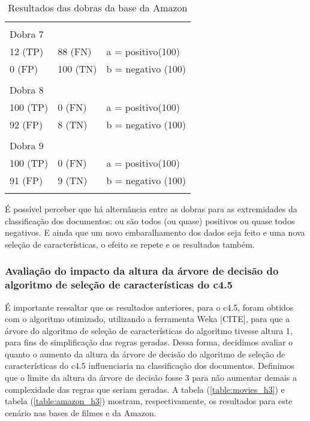 \documentclass[template.tex]{subfiles}
\begin{document}
\begin{table}[!h]
\begin{tabular}{lll}
    &&\\
    Dobra 7    \\
    12 (TP)                 &88 (FN)                    & a = positivo(100) \\ 
    0 (FP)                  &100 (TN)                   & b = negativo (100) \\
    &&\\
    Dobra 8    \\
    100 (TP)                    &0 (FN)                     & a = positivo(100) \\ 
    92 (FP)                 &8 (TN)                     & b = negativo (100) \\
    &&\\
    Dobra 9    \\
    100 (TP)                    &0 (FN)                     & a = positivo(100) \\ 
    91 (FP)                 &9 (TN)                     & b = negativo (100) \\
    &&\\
    \end{tabular}
    \caption{Resultados das dobras da base da Amazon}
    \label{table:amazon_folds}
\end{table}

É possível perceber que há alternância entre as dobras para as extremidades da classificação dos documentos: ou são todos (ou quase) positivos ou quase todos negativos. E ainda que um novo embaralhamento dos dados seja feito e uma nova seleção de características, o efeito se repete e os resultados também. 


\subsubsection{Avaliação do impacto da altura da árvore de decisão do algoritmo de seleção de características do c4.5}

É importante ressaltar que os resultados anteriores, para o c4.5, foram obtidos com o algoritmo otimizado, utilizando a ferramenta Weka [CITE], para que a árvore do algoritmo de seleção de características do algoritmo tivesse altura 1, para fins de simplificação das regras geradas. Dessa forma, decidimos avaliar o quanto o aumento da altura da árvore de decisão do algoritmo de seleção de características do c4.5 influenciaria na classificação dos documentos. Definimos que o limite da altura da árvore de decisão fosse 3 para não aumentar demais a complexidade das regras que seriam geradas. A tabela (\ref{table:movies_h3}) e tabela (\ref{table:amazon_h3}) mostram, respectivamente, os resultados para este cenário nas bases de filmes e da Amazon.
\end{document}
